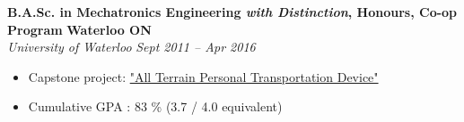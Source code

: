     \textbf{B.A.Sc. in Mechatronics Engineering \emph{with Distinction}, Honours, Co-op Program }
    \hfill
    \textbf{Waterloo ON}\\
    \textit{University of Waterloo}
    \hfill
    \textit{Sept 2011 -- Apr 2016}
    \begin{itemize}
        \item Capstone project: \href{https://youtu.be/OwfrKlr_Zhk}{"All Terrain Personal Transportation Device"}
        \item Cumulative GPA : 83 \% (3.7 / 4.0 equivalent)
    \end{itemize}
